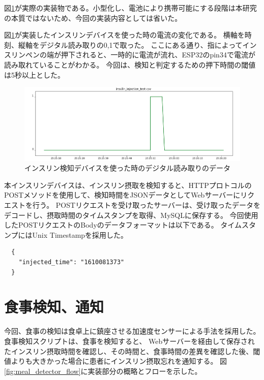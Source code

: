 図\ref{}が実際の実装物である。小型化し、電池により携帯可能にする段階は本研究の本質ではないため、今回の実装内容としては省いた。

図\ref{fig:insulin_injection_test}が実装したインスリンデバイスを使った時の電流の変化である。
横軸を時刻、縦軸をデジタル読み取りの0,1で取った。
ここにある通り、指によってインスリンペンの端が押下されると、一時的に電流が流れ、ESP32のpin34で電流が読み取れていることがわかる。
今回は、検知と判定するための押下時間の閾値は5秒以上とした。\cite{how_to_inject_insulin_1} \cite{how_to_inject_insulin_2}

\begin{figure}[htbp]
  \caption{インスリン検知デバイスを使った時のデジタル読み取りのデータ}
  \label{fig:insulin_injection_test}
  \begin{center}
    \includegraphics[bb=0 0 1000 350,width=17cm]{assets/insulin_injection_test.png}
  \end{center}
\end{figure}


本インスリンデバイスは、インスリン摂取を検知すると、HTTPプロトコルのPOSTメソッドを使用して、検知時間をJSONデータとしてWebサーバーにリクエストを行う。
POSTリクエストを受け取ったサーバーは、受け取ったデータをデコードし、摂取時間のタイムスタンプを取得、MySQLに保存する。
今回使用したPOSTリクエストのBodyのデータフォーマットは以下である。
タイムスタンプにはUnix Timestampを採用した。

\begin{verbatim}
  {
    "injected_time": "1610081373"
  }
\end{verbatim}

\section{食事検知、通知}

今回、食事の検知は食卓上に鎮座させる加速度センサーによる手法を採用した。食事検知スクリプトは、食事を検知すると、
Webサーバーを経由して保存されたインスリン摂取時間を確認し、その時間と、食事時間の差異を確認した後、閾値よりも大きかった場合に患者にインスリン摂取忘れを通知する。
図\ref{fig:meal_detector_flow}に実装部分の概略とフローを示した。

